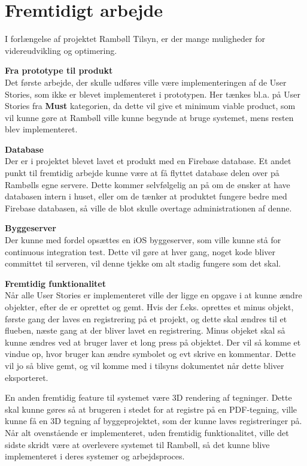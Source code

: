 \chapter{Fremtidigt arbejde}
I forlængelse af projektet Rambøll Tilsyn, er der mange muligheder for videreudvikling og optimering.

\textbf{Fra prototype til produkt} \\
Det første arbejde, der skulle udføres ville være implementeringen af de User Stories, som ikke er blevet implementeret i prototypen. Her tænkes bl.a. på User Stories fra \textbf{Must} kategorien, da dette vil give et minimum viable product, som vil kunne gøre at Rambøll ville kunne begynde at bruge systemet, mens resten blev implementeret. 

\textbf{Database} \\
Der er i projektet blevet lavet et produkt med en Firebase database. Et andet punkt til fremtidig arbejde kunne være at få flyttet database delen over på Rambølls egne servere. Dette kommer selvfølgelig an på om de ønsker at have databasen intern i huset, eller om de tænker at produktet fungere bedre med Firebase databasen, så ville de blot skulle overtage administrationen af denne. 

\textbf{Byggeserver} \\
Der kunne med fordel opsættes en iOS byggeserver, som ville kunne stå for continuous integration\cite{CI} test. Dette vil gøre at hver gang, noget kode bliver committet til serveren, vil denne tjekke om alt stadig fungere som det skal.

\textbf{Fremtidig funktionalitet} \\
Når alle User Stories er implementeret ville der ligge en opgave i at kunne ændre objekter, efter de er oprettet og gemt. Hvis der f.eks. oprettes et minus objekt, første gang der laves en registrering på et projekt, og dette skal ændres til et flueben, næste gang at der bliver lavet en registrering. Minus objeket skal så kunne ændres ved at bruger laver et long press på objektet. Der vil så komme et vindue op, hvor bruger kan ændre symbolet og evt skrive en kommentar. Dette vil jo så blive gemt, og vil komme med i tilsyns dokumentet når dette bliver eksporteret. 

En anden fremtidig feature til systemet være 3D rendering af tegninger. Dette skal kunne gøres så at brugeren i stedet for at registre på en PDF-tegning, ville kunne få en 3D tegning af byggeprojektet, som der kunne laves registreringer på. \\

Når alt ovenstående er implementeret, uden fremtidig funktionalitet, ville det sidste skridt være at overlevere systemet til Rambøll, så det kunne blive implementeret i deres systemer og arbejdsproces.